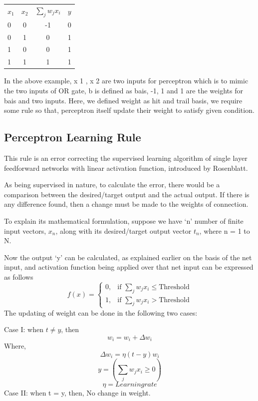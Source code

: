 \documentclass[a4paper,12pt]{report}
\begin{document}
\begin{table}
\centering
\begin{tabular}{|l|c|c|l|}
	$x_1$ & $x_2$ & $\sum_j{w_j x_i}$ & $y$ \\
	0 & 0 & -1 & 0\\
	0 & 1 & 0 & 1\\
	1 & 0 & 0 & 1\\
	1 & 1 & 1 & 1\\
\end{tabular}
\end{table}
In the above example, x 1 , x 2 are two inputs for perceptron which is to
mimic the two inputs of OR gate, b is defined as bais, -1, 1 and 1 are the
weights for bais and two inputs.
Here, we defined weight as hit and trail basis, we require some rule so
that, perceptron itself update their weight to satisfy given condition.
\subsection{Perceptron Learning Rule}
This rule is an error correcting the supervised learning algorithm of single layer feedforward networks with linear activation function, introduced by Rosenblatt.

 As being supervised in nature, to calculate the error, there would be a comparison between the desired/target output and the actual output. If there is any difference found, then a change must be made to the weights of connection.
 
 To explain its mathematical formulation, suppose we have ‘n’ number of finite input vectors, $x_n$, along with its desired/target output vector $t_n$, where n = 1 to N.

Now the output ‘y’ can be calculated, as explained earlier on the basis of the net input, and activation function being applied over that net input can be expressed as follows 
\begin{equation}
f(x)=
\begin{cases}
    0,& \text{if } \sum_j{w_j x_i} \leq \text{Threshold}\\
    1, & \text{if }  \sum_j{w_j x_i} > \text{Threshold}
\end{cases}
\end{equation}
The updating of weight can be done in the following two cases:

Case I:  when $t \neq y$, then
\begin{equation}
w_i=w_i +\Delta w_i 
\end{equation}
Where,
\begin{equation}
\Delta w_i = \eta (t - y) w_i 
\end{equation}
\begin{equation}
y = (\sum_j{w_j x_i} \geq 0)
\end{equation}
\begin{equation}
\eta = Learning rate
\end{equation}
Case II: when t = y, then,
No change in weight.
\end{document}
